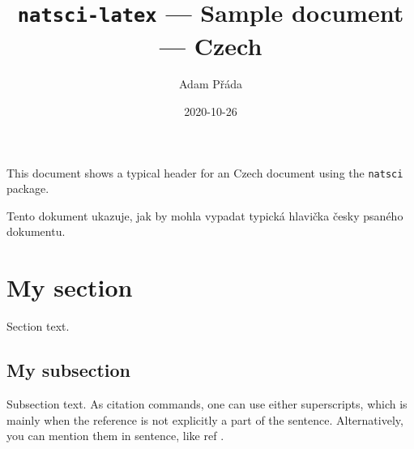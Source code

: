 \documentclass[11pt]{article}
\title{\texttt{natsci-latex} --- Sample document --- Czech}
\author{Adam Přáda}
\date{2020-10-26}
\begin{document}
    \pagestyle{fancy}
    \maketitle
    This document shows a typical header for an Czech document using the \texttt{natsci} package.
    
    Tento dokument ukazuje, jak by mohla vypadat typická hlavička česky psaného dokumentu.
    
    \section{My section}
    Section text.
    \subsection{My subsection}
    Subsection text.
    \newpage
    As citation commands, one can use either superscripts, which is mainly when the reference is not explicitly a part of the sentence.\supercite{cit1} Alternatively, you can mention them in sentence, like ref \cite{cit2}.
    \printbibliography
\end{document}
